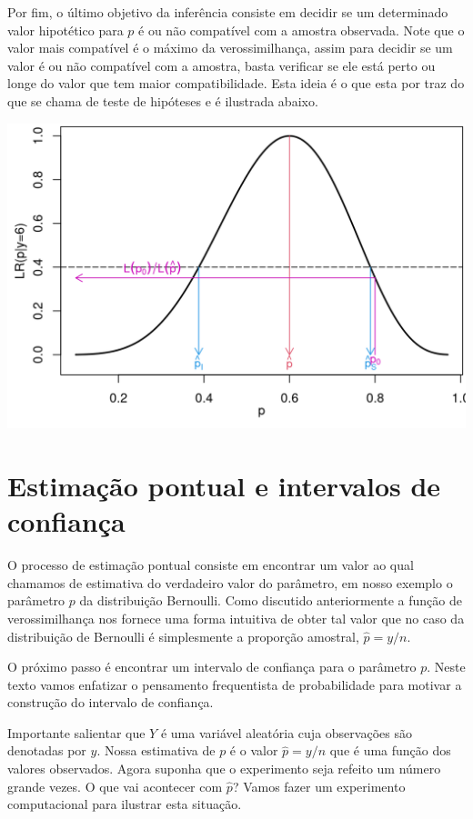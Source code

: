 \documentclass[
  10pt,
  a4paper]{book}
\begin{document}
Por fim, o último objetivo da inferência consiste em decidir se um determinado valor hipotético para \(p\) é ou não compatível com a amostra observada. Note que o valor mais compatível é o máximo da verossimilhança, assim para decidir se um valor é ou não compatível com a amostra, basta verificar se ele está perto ou longe do valor que tem maior compatibilidade. Esta ideia é o que esta por traz do que se chama de teste de hipóteses e é ilustrada abaixo.

\begin{center}\includegraphics{figures/unnamed-chunk-378-1} \end{center}

\hypertarget{estimauxe7uxe3o-pontual-e-intervalos-de-confianuxe7a}{%
\section{Estimação pontual e intervalos de confiança}\label{estimauxe7uxe3o-pontual-e-intervalos-de-confianuxe7a}}

O processo de estimação pontual consiste em encontrar um valor ao qual chamamos de estimativa do verdadeiro valor do parâmetro, em nosso exemplo o parâmetro \(p\) da distribuição Bernoulli. Como discutido anteriormente a função de verossimilhança nos fornece uma forma intuitiva de obter tal valor que no caso da distribuição de Bernoulli é simplesmente a proporção amostral, \(\hat{p} = y/n\).

O próximo passo é encontrar um intervalo de confiança para o parâmetro \(p\). Neste texto vamos enfatizar o pensamento frequentista de probabilidade para motivar a construção do intervalo de confiança.

Importante salientar que \(Y\) é uma variável aleatória cuja observações são denotadas por \(y\). Nossa estimativa de \(p\) é o valor \(\hat{p} = y/n\) que é uma função dos valores observados. Agora suponha que o experimento seja refeito um número grande vezes. O que vai acontecer com \(\hat{p}\)? Vamos fazer um experimento computacional para ilustrar esta situação.
\end{document}
